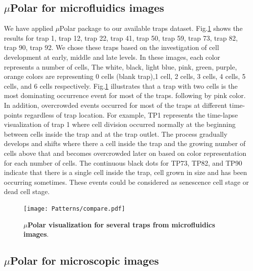 \documentclass[conference]{IEEEtran}
\begin{document}
\subsection{$\mu$Polar for microfluidics images}

We have applied $\mu$Polar package to our available traps dataset. Fig.\ref{fig:compare} shows the results for trap 1, trap 12, trap 22, trap 41, trap 50, trap 59, trap 73, trap 82, trap 90, trap 92. We chose these traps based on the investigation of cell development at early, middle and late levels. In these images, each color represents a number of cells, The white, black, light blue, pink, green, purple, orange colors are representing 0 cells (blank trap),1 cell, 2 cells, 3 cells, 4 cells, 5 cells, and 6 cells respectively. 
Fig.\ref{fig:compare} illustrates that a trap with two cells is the most dominating occurrence event for most of the traps. following by pink color. In addition, overcrowded events occurred for most of the traps at different time-points regardless of trap location. For example, TP1 represents the time-lapse visualization of trap 1 where cell division occurred normally at the beginning between cells inside the trap and at the trap outlet.  The process gradually develops and shifts where there a cell inside the trap and the growing number of cells above that and becomes overcrowded later on based on color representation for each number of cells. The continuous black dots for TP73, TP82, and TP90 indicate that there is a single cell inside the trap, cell grown in size and has been occurring sometimes. These events could be considered as senescence cell stage or dead cell stage.         


\begin{figure}
\centering
\texttt{[image: Patterns/compare.pdf]}
\caption{ \textbf{ $\mu$Polar visualization for several traps from microfluidics images}.}
\label{fig:compare}
\end{figure}



\subsection{$\mu$Polar for microscopic images}
\end{document}
